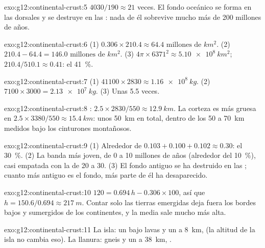 \begin{solution}{exo:g12:continental-crust:5}
$4030/190 \approx 21$ veces. El fondo oceánico se forma en las dorsales y se
destruye en las : nada de él sobrevive mucho más de 200
millones de años.
\end{solution}

\begin{solution}{exo:g12:continental-crust:6}
(1) $0.306 \times 210.4 \approx \num{64.4}\text{ millones de }\unit{km^2}$.
(2) $210.4 - 64.4 = \num{146.0}\text{ millones de }\unit{km^2}$.
(3) $4\pi \times 6371^2 \approx \qty{5.10e8}{km^2}$; $210.4/510.1 \approx
0.41$: el \qty{41}{\percent}.
\end{solution}

\begin{solution}{exo:g12:continental-crust:7}
(1) $41100 \times 2830 \approx \qty{1.16e8}{kg}$. (2) $7100 \times 3000 =
\qty{2.13e7}{kg}$. (3) Unas 5.5 veces.
\end{solution}

\begin{solution}{exo:g12:continental-crust:8}
: $2.5 \times 2830/550 \approx \qty{12.9}{km}$. La corteza es más gruesa en
$2.5 \times 3380/550 \approx \qty{15.4}{km}$: unos \qty{50}{km} en total,
dentro de los 50 a \qty{70}{km} medidos bajo los cinturones montañosos.
\end{solution}

\begin{solution}{exo:g12:continental-crust:9}
(1) Alrededor de $0.103 + 0.100 + 0.102 \approx 0.30$: el \qty{30}{\percent}.
(2) La banda más joven, de 0 a 10 millones de años (alrededor del
\qty{10}{\percent}), casi empatada con la de 20 a 30. (3) El fondo antiguo se
ha destruido en las ; cuanto más antiguo es el fondo, más
parte de él ha desaparecido.
\end{solution}

\begin{solution}{exo:g12:continental-crust:10}
$120 = 0.694\,h - 0.306 \times 100$, así que $h = 150.6/0.694 \approx
\qty{217}{m}$. Contar solo las tierras emergidas deja fuera los bordes bajos y
sumergidos de los continentes, y la media sale mucho más alta.
\end{solution}

\begin{solution}{exo:g12:continental-crust:11}
La isla: un  bajo lavas y un  a \qty{8}{km}, 
(la altitud de la isla no cambia eso). La llanura: gneis y un
 a \qty{38}{km}, .
\end{solution}

